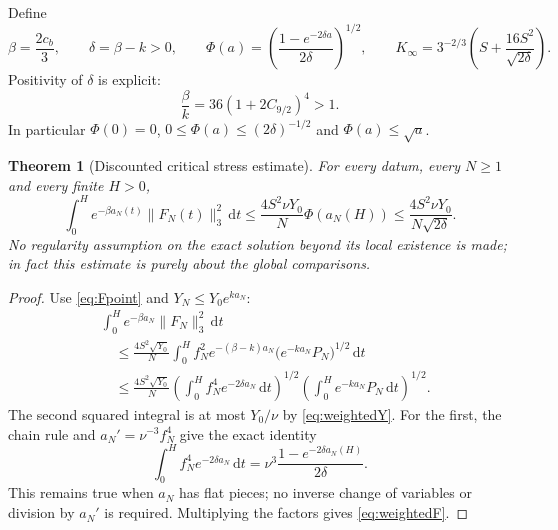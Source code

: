 \documentclass[11pt,a4paper]{article}
\newtheorem{theorem}{Theorem}[section]
\theoremstyle{definition}\newtheorem{definition}[theorem]{Definition}
\theoremstyle{remark}\newtheorem{remark}[theorem]{Remark}
\newcommand{\dd}{\,\mathrm d}
\newcommand{\norm}[1]{\lVert #1\rVert}
\newcommand{\Kinf}{K_\infty}
\numberwithin{equation}{section}
\begin{document}
Define
\begin{equation}\label{eq:weightedconstants}
 \beta=\frac{2c_b}{3},\qquad
 \delta=\beta-k>0,\qquad
 \Phi(a)=\left(\frac{1-e^{-2\delta a}}{2\delta}\right)^{1/2},\qquad
 \Kinf=3^{-2/3}\left(S+\frac{16S^2}{\sqrt{2\delta}}\right).
\end{equation}
Positivity of $\delta$ is explicit:
\begin{equation}\label{eq:betaoverk}
 \frac\beta k=36(1+2C_{9/2})^4>1.
\end{equation}
In particular $\Phi(0)=0$, $0\le\Phi(a)\le(2\delta)^{-1/2}$ and $\Phi(a)\le\sqrt a$.

\begin{theorem}[Discounted critical stress estimate]\label{thm:weightedF}
For every datum, every $N\ge1$ and every finite $H>0$,
\begin{equation}\label{eq:weightedF}
 \boxed{\quad
 \int_0^H e^{-\beta a_N(t)}\norm{F_N(t)}_3^2\dd t
 \le\frac{4S^2\nu Y_0}{N}\Phi(a_N(H))
 \le\frac{4S^2\nu Y_0}{N\sqrt{2\delta}}.\quad}
\end{equation}
No regularity assumption on the exact solution beyond its local existence is made; in fact this estimate is purely about the global comparisons.
\end{theorem}
\begin{proof}
Use \eqref{eq:Fpoint} and $Y_N\le Y_0e^{ka_N}$:
\begin{align*}
 &\int_0^H e^{-\beta a_N}\norm{F_N}_3^2\dd t\\
 &\quad\le\frac{4S^2\sqrt{Y_0}}N
 \int_0^H f_N^2 e^{-(\beta-k)a_N}
                \bigl(e^{-ka_N}P_N\bigr)^{1/2}\dd t\\
 &\quad\le\frac{4S^2\sqrt{Y_0}}N
 \left(\int_0^H f_N^4e^{-2\delta a_N}\dd t\right)^{1/2}
 \left(\int_0^H e^{-ka_N}P_N\dd t\right)^{1/2}.
\end{align*}
The second squared integral is at most $Y_0/\nu$ by \eqref{eq:weightedY}. For the first, the chain rule and $a_N'=\nu^{-3}f_N^4$ give the exact identity
\begin{equation}\label{eq:exacttimeintegral}
 \int_0^H f_N^4e^{-2\delta a_N}\dd t
 =\nu^3\frac{1-e^{-2\delta a_N(H)}}{2\delta}.
\end{equation}
This remains true when $a_N$ has flat pieces; no inverse change of variables or division by $a_N'$ is required. Multiplying the factors gives \eqref{eq:weightedF}.
\end{proof}
\end{document}
